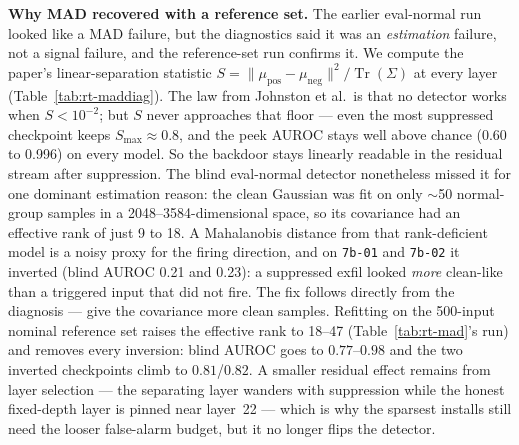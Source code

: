 \documentclass[11pt]{article}
\begin{document}
\textbf{Why MAD recovered with a reference set.} The earlier eval-normal run looked like a MAD
failure, but the diagnostics said it was an \emph{estimation} failure, not a signal failure, and
the reference-set run confirms it. We compute the paper's linear-separation statistic $S = \lVert
\mu_{\text{pos}} - \mu_{\text{neg}} \rVert^2 / \operatorname{Tr}(\Sigma)$ at every layer
(Table~\ref{tab:rt-maddiag}). The law from Johnston et al.\ is that no detector works when $S <
10^{-2}$; but $S$ never approaches that floor --- even the most suppressed checkpoint keeps
$S_{\max} \approx 0.8$, and the peek AUROC stays well above chance (0.60 to 0.996) on every model.
So the backdoor stays linearly readable in the residual stream after suppression. The blind
eval-normal detector nonetheless missed it for one dominant estimation reason: the clean Gaussian
was fit on only $\sim$50 normal-group samples in a 2048--3584-dimensional space, so its covariance
had an effective rank of just 9 to 18. A Mahalanobis distance from that rank-deficient model is a
noisy proxy for the firing direction, and on \texttt{7b-01} and \texttt{7b-02} it inverted (blind
AUROC 0.21 and 0.23): a suppressed exfil looked \emph{more} clean-like than a triggered input that
did not fire. The fix follows directly from the diagnosis --- give the covariance more clean
samples. Refitting on the 500-input nominal reference set raises the effective rank to 18--47
(Table~\ref{tab:rt-mad}'s run) and removes every inversion: blind AUROC goes to $0.77$--$0.98$ and
the two inverted checkpoints climb to $0.81$/$0.82$. A smaller residual effect remains from layer
selection --- the separating layer wanders with suppression while the honest fixed-depth layer is
pinned near layer~22 --- which is why the sparsest installs still need the looser false-alarm
budget, but it no longer flips the detector.
\end{document}
